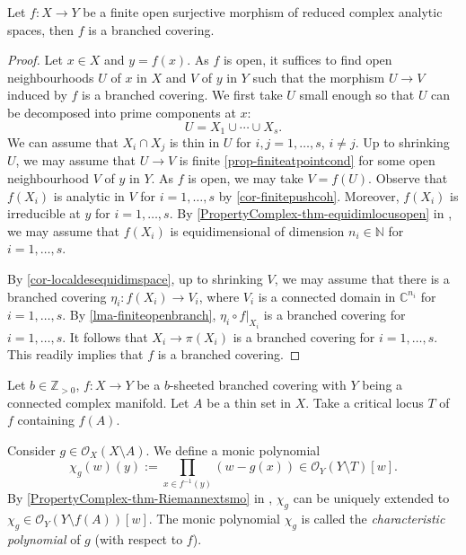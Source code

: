 \begin{thm}\label{thm-finiteopensurjbranchedcov}
    Let $f:X\rightarrow Y$ be a finite open surjective morphism of reduced complex analytic spaces, then $f$ is a branched covering.
\end{thm}
\begin{proof}
    Let $x\in X$ and $y=f(x)$. As $f$ is open, it suffices to find open neighbourhoods $U$ of $x$ in $X$ and $V$ of $y$ in $Y$ such that the morphism $U\rightarrow V$ induced by $f$ is a branched covering. 
    We first take $U$ small enough so that $U$ can be decomposed into prime components at $x$:
    \[
        U=X_1\cup\cdots\cup X_s.
    \]  
    We can assume that $X_i\cap X_j$ is thin in $U$ for $i,j=1,\ldots,s$, $i\neq j$. Up to shrinking $U$, we may assume that $U\rightarrow V$ is finite \cref{prop-finiteatpointcond} for some open neighbourhood $V$ of $y$ in $Y$. As $f$ is open, we may take $V=f(U)$.
    Observe that $f(X_i)$ is analytic in $V$ for $i=1,\ldots,s$ by \cref{cor-finitepushcoh}. Moreover, $f(X_i)$ is irreducible at $y$ for $i=1,\ldots,s$. By \cref{PropertyComplex-thm-equidimlocusopen} in , we may assume that $f(X_i)$ is equidimensional of dimension $n_i\in \mathbb{N}$ for $i=1,\ldots,s$.
    
    By \cref{cor-localdesequidimspace}, up to shrinking $V$, we may assume that there is a branched covering $\eta_i:f(X_i)\rightarrow V_i$, where $V_i$ is a connected domain in $\mathbb{C}^{n_i}$ for $i=1,\ldots,s$. By \cref{lma-finiteopenbranch}, $\eta_i\circ f|_{X_i}$ is a branched covering for $i=1,\ldots,s$.  It follows that $X_i\rightarrow \pi(X_i)$ is a branched covering for $i=1,\ldots,s$. This readily implies that $f$ is a branched covering.
\end{proof}



\begin{definition}\label{def-charpolmanifold}
    Let $b\in \mathbb{Z}_{>0}$, $f:X\rightarrow Y$ be a $b$-sheeted branched covering with $Y$ being a connected complex manifold. Let $A$ be a thin set in $X$. Take a critical locus $T$ of $f$ containing $f(A)$. 
    
    Consider $g\in \mathcal{O}_X(X\setminus A)$. We define a monic polynomial
    \[
        \chi_g(w)(y):=\prod_{x\in f^{-1}(y)} (w-g(x))\in \mathcal{O}_Y(Y\setminus T)[w]. 
    \]
    By \cref{PropertyComplex-thm-Riemannextsmo} in , $\chi_g$ can be uniquely extended to $\chi_g\in \mathcal{O}_Y(Y\setminus f(A))[w]$. The monic polynomial $\chi_g$ is called the \emph{characteristic polynomial} of $g$ (with respect to $f$).
\end{definition}

